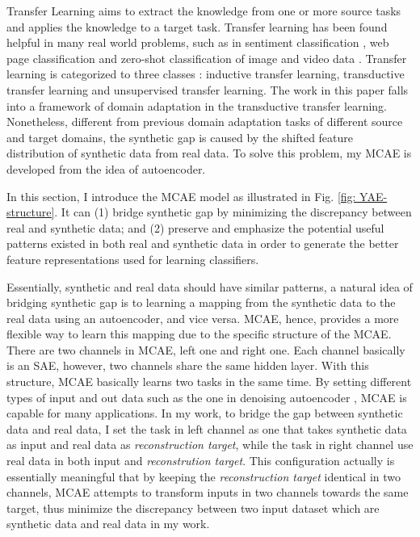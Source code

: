 \documentclass{iitthesis}
\begin{document}
Transfer Learning aims to extract the knowledge from one or more source tasks and applies the knowledge to a target task. Transfer learning has been found helpful in many real world problems, such as in sentiment classification \cite{Blitzer07Biographies}, web page classification\textcolor{red}{{} }\cite{Sarinnapakorn:2007:CST:1313047.1313197} and zero-shot classification of image and video data \cite{lampert13AwAPAMI,lampert2009zeroshot_dat,yanweiPAMIlatentattrib,yao2011action_part,yanweiembedding,yanweiBMVC,RohrbachCVPR12,rohrbach2010semantic_transfer,RichardNIPS13}. Transfer learning is categorized to three classes \cite{pan2009transfer_survey}: inductive transfer learning, transductive transfer learning and unsupervised transfer learning. The work in this paper falls into a framework of domain adaptation \cite{Ben-David:2010:TLD:1745449.1745461,Weinberger:2009:FHL:1553374.1553516}
in the transductive transfer learning. Nonetheless, different from previous domain adaptation tasks of different source and target domains, the synthetic gap is caused by the shifted feature distribution of synthetic data from real data. To solve this problem, my MCAE is developed from the idea of autoencoder.


In this section, I introduce the MCAE model as illustrated in Fig.
\ref{fig: YAE-structure}. It can (1) bridge synthetic gap by minimizing
the discrepancy between real and synthetic data; and (2) preserve
and emphasize the potential useful patterns existed in both real and
synthetic data in order to generate the better feature representations
used for learning classifiers. 
 
Essentially, synthetic and real data should have similar patterns, a natural
idea of bridging synthetic gap is to learning a mapping from the synthetic data to the real data using an autoencoder, and vice versa. MCAE, hence, provides a more flexible way to learn this mapping due to the specific structure of the MCAE. There are two channels in MCAE, left one and right one. Each channel basically is an SAE, however, two channels share the same hidden layer. With this structure, MCAE basically learns two tasks in the same time. By setting different types of input and out data such as the one in denoising autoencoder \cite{VP:10}, MCAE is capable for many applications. In my work, to bridge the gap between synthetic data and real data, I set the task in left channel as one that takes synthetic data as input and real data as \textit{reconstruction target}, while the task in right channel use real data in both input and \textit{reconstrution target}. This configuration actually is essentially meaningful that by keeping the \textit{reconstruction target} identical in two channels, MCAE attempts to transform inputs in two channels towards the same target, thus minimize the discrepancy between two input dataset which are synthetic data and real data in my work.
\end{document}

